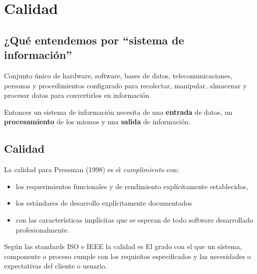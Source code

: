 
\chapter{Calidad}

\section{¿Qué entendemos por ``sistema de información''}

\begin{definition}
   Conjunto único de hardware, software, bases de datos,
   telecomunicaciones, personas y procedimientos configurado
   para recolectar, manipular, almacenar y procesar datos para
   convertirlos en información
\end{definition}

Entonces un sistema de información necesita de una \textbf{entrada} de datos, un \textbf{procesamiento} de los mismos y una \textbf{salida} de información.

\section{Calidad}
\begin{definition}[Calidad - 1] 
   La calidad para Pressman (1998) es el \textit{cumplimiento} con:
   \begin{itemize}
      \item los requerimientos funcionales y de rendimiento explícitamente establecidos,
      \item los estándares de desarrollo explícitamente documentados
      \item con las características implícitas que se esperan de todo
      software desarrollado profesionalmente.
   \end{itemize}
\end{definition}

\begin{definition}[Calidad - 2]
   Según las standards ISO e IEEE la calidad es
   El grado con el que un sistema, componente o proceso
   cumple con los requisitos especificados y las necesidades o
   expectativas del cliente o usuario.
\end{definition}

